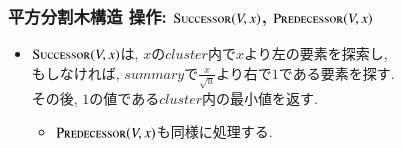 \documentclass[main]{subfiles}
\begin{document}
\begin{frame}\frametitle{平方分割木構造 操作: {\small $\mathrm{\text{S\textsc{uccessor}}}(V,x)$, $\mathrm{\text{P\textsc{redecessor}}}(V,x)$}}
\begin{itemize}
\item {\small $\mathrm{\text{S\textsc{uccessor}}}(V,x)$}は, $x$の$cluster$内で$x$より左の要素を探索し,\\
	もしなければ, $summary$で$\frac{x}{\sqrt{u}}$より右で$1$である要素を探す.\\
	その後, $1$の値である$cluster$内の最小値を返す.
\begin{itemize}
	\item $\mathrm{\text{P\textsc{redecessor}}}(V,x)$も同様に処理する.
\end{itemize}
\end{itemize}
 

\end{frame}
\end{document}
